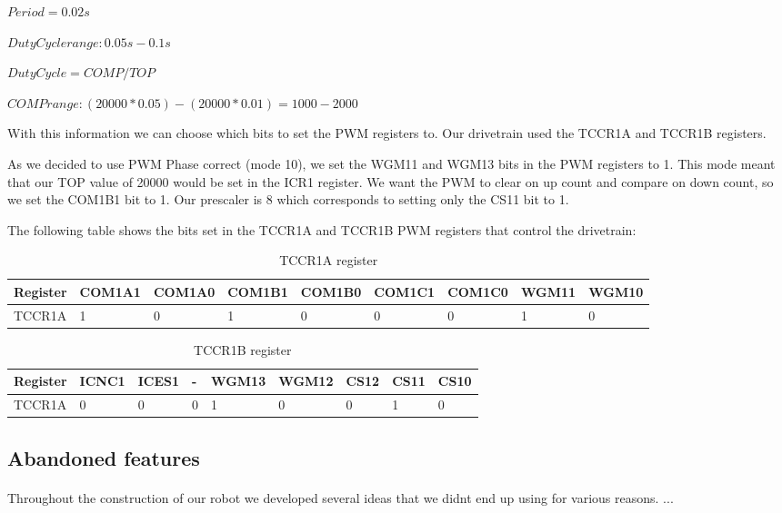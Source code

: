 \documentclass[12pt, a4paper]{article}
\begin{document}
        $Period = 0.02s$
  
        $Duty Cycle range: 0.05s - 0.1s$
  
        $Duty Cycle = COMP/TOP$
  
        $COMP range: (20000*0.05)-(20000*0.01) = 1000-2000$
  
        With this information we can choose which bits to set the PWM registers to. Our drivetrain used the TCCR1A and TCCR1B registers.
  
        As we decided to use PWM Phase correct (mode 10), we set the WGM11 and WGM13 bits in the PWM registers to 1. This mode meant that our TOP value of 20000 would be set in the ICR1 register.
        We want the PWM to clear on up count and compare on down count, so we set the COM1B1 bit to 1.
        Our prescaler is 8 which corresponds to setting only the CS11 bit to 1.
  
        The following table shows the bits set in the TCCR1A and TCCR1B PWM registers that control the drivetrain:
      \begin{table}[h]
        \centering
        \begin{tabular}{l|l|l|l|l|l|l|l|l}
          Register & COM1A1 & COM1A0 & COM1B1 & COM1B0 & COM1C1 & COM1C0 & WGM11 & WGM10 \\ \hline \hline
          TCCR1A & 1 & 0 & 1 & 0 & 0 & 0 & 1 & 0 \\ \hline                        
        \end{tabular}
      \caption{TCCR1A register}
      \label{tab:nome}
      \end{table}
  
      \begin{table}[h]
        \centering
        \begin{tabular}{l|l|l|l|l|l|l|l|l}
          Register & ICNC1 & ICES1 & - & WGM13 & WGM12 & CS12 & CS11 & CS10 \\ \hline \hline
          TCCR1A & 0 & 0 & 0 & 1 & 0 & 0 & 1 & 0 \\ \hline                        
        \end{tabular}
        \caption{TCCR1B register}
        \label{tab:nome}
      \end{table}

      \subsection{Abandoned features}
        \paragraph{}
          Throughout the construction of our robot we developed several ideas that we didnt end up using for various reasons. ...
        
\end{document}
